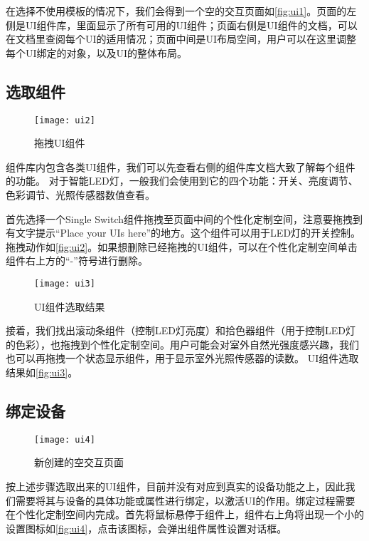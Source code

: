 在选择不使用模板的情况下，我们会得到一个空的交互页面如\autoref{fig:ui1}。页面的左侧是UI组件库，里面显示了所有可用的UI组件；页面右侧是UI组件的文档，可以在文档里查阅每个UI的适用情况；页面中间是UI布局空间，用户可以在这里调整每个UI绑定的对象，以及UI的整体布局。

\subsection{选取组件}
\begin{figure}[htbp]
	\centering
	\texttt{[image: ui2]}
	\caption{拖拽UI组件}
	\label{fig:ui2}
\end{figure}

组件库内包含各类UI组件，我们可以先查看右侧的组件库文档大致了解每个组件的功能。
对于智能LED灯，一般我们会使用到它的四个功能：开关、亮度调节、色彩调节、光照传感器数值查看。

首先选择一个Single Switch组件拖拽至页面中间的个性化定制空间，注意要拖拽到有文字提示“Place your UIs here”的地方。这个组件可以用于LED灯的开关控制。拖拽动作如\autoref{fig:ui2}。如果想删除已经拖拽的UI组件，可以在个性化定制空间单击组件右上方的“-”符号进行删除。

\begin{figure}[t]
	\centering
	\texttt{[image: ui3]}
	\caption{UI组件选取结果}
	\label{fig:ui3}
\end{figure}

接着，我们找出滚动条组件（控制LED灯亮度）和拾色器组件（用于控制LED灯的色彩），也拖拽到个性化定制空间。用户可能会对室外自然光强度感兴趣，我们也可以再拖拽一个状态显示组件，用于显示室外光照传感器的读数。
UI组件选取结果如\autoref{fig:ui3}。

\subsection{绑定设备}
\begin{figure}[htbp]
	\centering
	\texttt{[image: ui4]}
	\caption{新创建的空交互页面}
	\label{fig:ui4}
\end{figure}

按上述步骤选取出来的UI组件，目前并没有对应到真实的设备功能之上，因此我们需要将其与设备的具体功能或属性进行绑定，以激活UI的作用。绑定过程需要在个性化定制空间内完成。首先将鼠标悬停于组件上，组件右上角将出现一个小的设置图标如\autoref{fig:ui4}，点击该图标，会弹出组件属性设置对话框。

